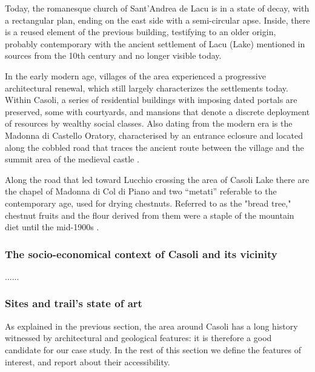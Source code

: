 \documentclass[sustainability,article,submit,pdftex,moreauthors]{Definitions/mdpi}
\begin{document}
Today, the romanesque church of Sant'Andrea de Lacu is in a state of decay, with a rectangular plan, ending on the east side with a semi-circular apse. Inside, there is a reused element of the previous building, testifying to an older origin, probably contemporary with the ancient settlement of Lacu (Lake) mentioned in sources from the 10th century and no longer visible today.

In the early modern age, villages of the area experienced a progressive architectural renewal, which still largely characterizes the settlements today. Within Casoli, a series of residential buildings with imposing dated portals are preserved, some with courtyards, and mansions that denote a discrete deployment of resources by wealthy social classes. Also dating from the modern era is the Madonna di Castello Oratory, characterised by an entrance eclosure and located along the cobbled road that traces the ancient route between the village and the summit area of the medieval castle \cite{gia96}.

Along the road that led toward Lucchio crossing the area of Casoli Lake there are the chapel of Madonna di Col di Piano and two “metati” referable to the contemporary age, used for drying chestnuts. Referred to as the "bread tree," chestnut fruits and the flour derived from them were a staple of the mountain diet until the mid-1900s \cite{buc92, puc10}.


\subsubsection{The socio-economical context of Casoli and its vicinity}

......

\subsubsection{Sites and trail’s state of art}


As explained in the previous section, the area around Casoli has a long history witnessed by architectural and geological features: it is therefore a good candidate for our case study. In the rest of this section we define the features of interest, and report about their accessibility.
\end{document}
